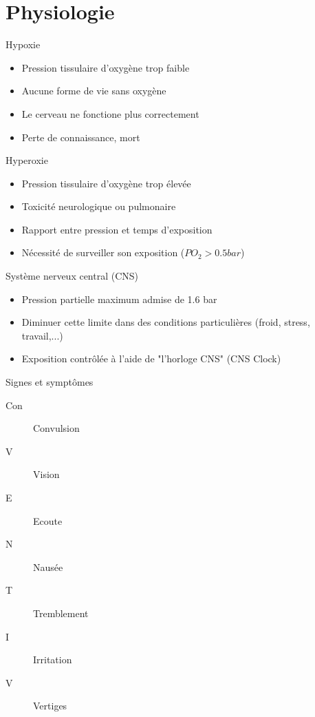 
\section{Physiologie}

\begin{frame}{Hypoxie}  
	\begin{itemize}
		\item Pression tissulaire d'oxygène trop faible
		\item Aucune forme de vie sans oxygène
		\item Le cerveau ne fonctione plus correctement
		\item Perte de connaissance, mort
	\end{itemize}
\end{frame}

\begin{frame}{Hyperoxie}  
	\begin{itemize}
		\item Pression tissulaire d'oxygène trop élevée
		\item Toxicité neurologique ou pulmonaire
		\item Rapport entre pression et temps d'exposition
		\item Nécessité de surveiller son exposition ($PO_2>0.5bar$)
	\end{itemize}
\end{frame}

\begin{frame}{Système nerveux central (CNS)}  
	\begin{itemize}
		\item Pression partielle maximum admise de 1.6 bar
		\item Diminuer cette limite dans des conditions particulières (froid, stress, travail,...)
		\item Exposition contrôlée à l'aide de "l'horloge CNS" (CNS Clock)
	\end{itemize}
\end{frame}

\begin{frame}{Signes et symptômes}  
	\begin{description}
		\item[Con]Convulsion
		\item[V]Vision
		\item[E]Ecoute
		\item[N]Nausée
		\item[T]Tremblement
		\item[I]Irritation
		\item[V]Vertiges
	\end{description}
\end{frame}

